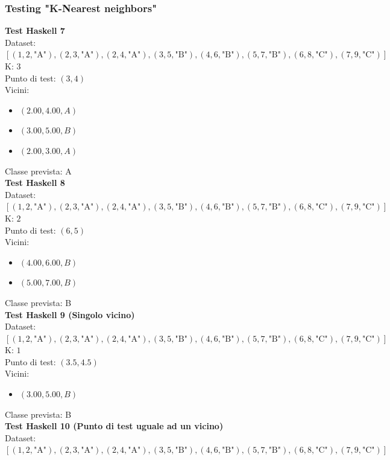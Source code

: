 \documentclass[11pt]{article}
\theoremstyle{definition}
\begin{document}
\subsubsection{Testing "K-Nearest neighbors"}
\textbf{Test Haskell 7}\\
Dataset: $[(1, 2, \text{"A"}), (2, 3, \text{"A"}), (2, 4, \text{"A"}), (3, 5, \text{"B"}), (4, 6, \text{"B"}), (5, 7, \text{"B"}), (6, 8, \text{"C"}), (7, 9, \text{"C"})]$\\
K: $3$\\
Punto di test: $(3, 4)$\\
Vicini:
\begin{itemize}
\item $(2.00,4.00, A)$
\item $(3.00,5.00, B)$
\item $(2.00,3.00, A)$
\end{itemize}
Classe prevista: A\\
\newline
\textbf{Test Haskell 8}\\
Dataset: $[(1, 2, \text{"A"}), (2, 3, \text{"A"}), (2, 4, \text{"A"}), (3, 5, \text{"B"}), (4, 6, \text{"B"}), (5, 7, \text{"B"}), (6, 8, \text{"C"}), (7, 9, \text{"C"})]$\\
K: $2$\\
Punto di test: $(6, 5)$\\
Vicini:
\begin{itemize}
\item $(4.00,6.00, B)$
\item $(5.00,7.00, B)$
\end{itemize}
Classe prevista: B\\
\newline
\textbf{Test Haskell 9 (Singolo vicino)}\\
Dataset: $[(1, 2, \text{"A"}), (2, 3, \text{"A"}), (2, 4, \text{"A"}), (3, 5, \text{"B"}), (4, 6, \text{"B"}), (5, 7, \text{"B"}), (6, 8, \text{"C"}), (7, 9, \text{"C"})]$\\
K: $1$\\
Punto di test: $(3.5, 4.5)$\\
Vicini:
\begin{itemize}
\item $(3.00,5.00, B)$
\end{itemize}
Classe prevista: B\\
\newline
\textbf{Test Haskell 10 (Punto di test uguale ad un vicino)}\\
Dataset: $[(1, 2, \text{"A"}), (2, 3, \text{"A"}), (2, 4, \text{"A"}), (3, 5, \text{"B"}), (4, 6, \text{"B"}), (5, 7, \text{"B"}), (6, 8, \text{"C"}), (7, 9, \text{"C"})]$\\
\end{document}
